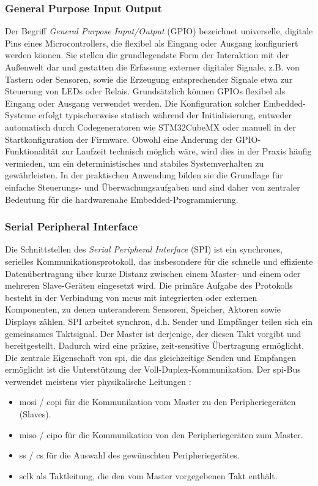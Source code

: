 \subsubsection*{General Purpose Input Output}
Der Begriff \textit{General Purpose Input/Output} (GPIO) bezeichnet universelle, digitale Pins eines Microcontrollers, die flexibel als Eingang oder Ausgang konfiguriert werden können.
Sie stellen die grundlegendste Form der Interaktion mit der Außenwelt dar und gestatten die Erfassung externer digitaler Signale, z.B. von Tastern oder Sensoren, sowie die Erzeugung entsprechender Signale etwa zur Steuerung von LEDs oder Relais.
Grundsätzlich können GPIOs flexibel als Eingang oder Ausgang verwendet werden.
Die Konfiguration solcher Embedded-Systeme erfolgt typischerweise statisch während der Initialisierung, entweder automatisch durch Codegeneratoren wie STM32CubeMX oder manuell in der Startkonfiguration der Firmware.
Obwohl eine Änderung der GPIO-Funktionalität zur Laufzeit technisch möglich wäre, wird dies in der Praxis häufig vermieden, um ein deterministisches und stabiles Systemverhalten zu gewährleisten.
In der praktischen Anwendung bilden sie die Grundlage für einfache Steuerungs- und Überwachungsaufgaben und sind daher von zentraler Bedeutung für die hardwarenahe Embedded-Programmierung.

\subsubsection*{Serial Peripheral Interface}
Die Schnittstellen des \emph{Serial Peripheral Interface} (SPI) ist ein synchrones, serielles Kommunikationsprotokoll, das insbesondere für die schnelle und effiziente Datenübertragung über kurze Distanz zwischen einem Master- und einem oder mehreren Slave-Geräten eingesetzt wird. 
Die primäre Aufgabe des Protokolls besteht in der Verbindung von \gls{mcu}s mit integrierten oder externen Komponenten, zu denen unteranderem  Sensoren, Speicher, Aktoren sowie Displays zählen.
SPI arbeitet synchron, d.h. Sender und Empfänger teilen sich ein gemeinsames Taktsignal.
Der Master ist derjenige, der diesen Takt vorgibt und bereitgestellt.
Dadurch wird eine präzise, zeit-sensitive Übertragung ermöglicht. 
Die zentrale Eigenschaft von \gls{spi}, die das gleichzeitige Senden und Empfangen ermöglicht ist die Unterstützung der Voll-Duplex-Kommunikation.
Der \gls{spi}-Bus verwendet meistens vier physikalische Leitungen :
\begin{itemize}
	\item \gls{mosi} / \gls{copi} für die Kommunikation vom Master zu den Peripheriegeräten (Slaves).
	\item \gls{miso} / \gls{cipo} für die Kommunikation von den Peripheriegeräten zum Master.
	\item \gls{ss} / \gls{cs} für die Auswahl des gewünschten Peripheriegerätes.
	\item \gls{sclk} als Taktleitung, die den vom Master vorgegebenen Takt enthält.
\end{itemize}

